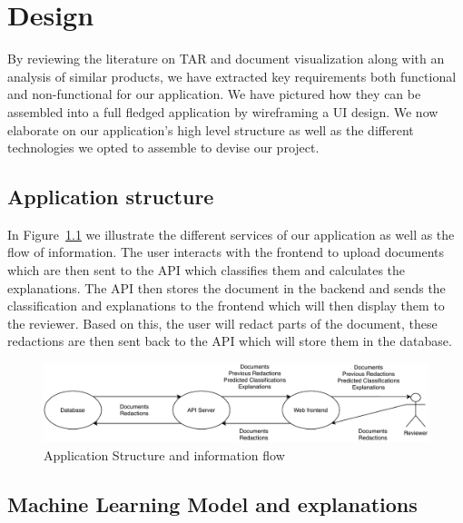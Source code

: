 \documentclass[\version]{l4proj}
\begin{document}
\chapter{Design}

By reviewing the literature on TAR and document visualization along with an analysis of similar products, we have extracted key requirements both functional and non-functional for our application.
We have pictured how they can be assembled into a full fledged application by wireframing a UI design.
We now elaborate on our application's high level structure as well as the different technologies we opted to assemble to devise our project.

\section{Application structure}

In Figure~\ref{fig:design_diagram} we illustrate the different services of our application as well as the flow of information.
The user interacts with the frontend to upload documents which are then sent to the API which classifies them and calculates the explanations.
The API then stores the document in the backend and sends the classification and explanations to the frontend which will then display them to the reviewer.
Based on this, the user will redact parts of the document, these redactions are then sent back to the API which will store them in the database.



\begin{figure}[H]
    \centering
    \includegraphics[width=\textwidth]{figures/design_diagram.pdf}
    \caption{Application Structure and information flow}\label{fig:design_diagram}
\end{figure}

\section{Machine Learning Model and explanations}
\end{document}
